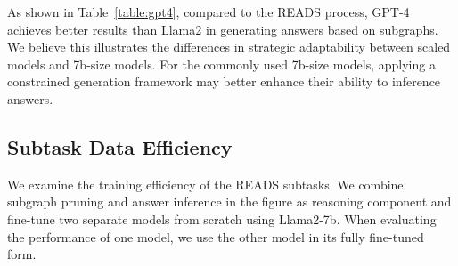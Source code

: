 \documentclass[11pt]{article}
\begin{document}
\begin{table}[h]
\centering
{}
\caption{The Hits@1 under different strategies.}
\label{table:gpt4}
\end{table}

As shown in Table~\ref{table:gpt4}, compared to the READS process, GPT-4 achieves better results than Llama2 in generating answers based on subgraphs. We believe this illustrates the differences in strategic adaptability between scaled models and 7b-size models. For the commonly used 7b-size models, applying a constrained generation framework may better enhance their ability to inference answers.

\subsection{Subtask Data Efficiency}
We examine the training efficiency of the READS subtasks. We combine subgraph pruning and answer inference in the figure as reasoning component and fine-tune two separate models from scratch using Llama2-7b. When evaluating the performance of one model, we use the other model in its fully fine-tuned form.
\end{document}
